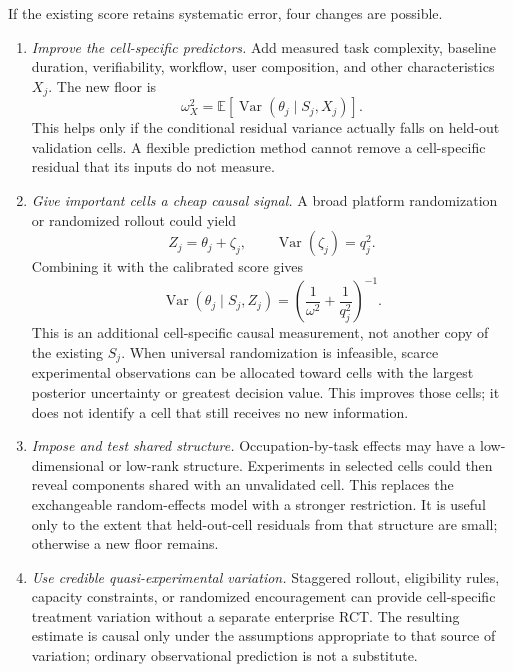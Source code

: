 \documentclass[11pt]{article}
\newcommand{\E}{\mathbb E}
\newcommand{\Var}{\operatorname{Var}}
\begin{document}
If the existing score retains systematic error, four changes are possible.

\begin{enumerate}[label=\arabic*.,leftmargin=2.2em]
 \item \textit{Improve the cell-specific predictors.} Add measured task
 complexity, baseline duration, verifiability, workflow, user composition,
 and other characteristics \(X_j\). The new floor is
 \begin{equation}
  \omega_X^2
  =\E[\Var(\theta_j\mid S_j,X_j)].
  \label{eq:x-floor}
 \end{equation}
 This helps only if the conditional residual variance actually falls on
 held-out validation cells. A flexible prediction method cannot remove a
 cell-specific residual that its inputs do not measure.

 \item \textit{Give important cells a cheap causal signal.} A broad platform
 randomization or randomized rollout could yield
 \begin{equation}
  Z_j=\theta_j+\zeta_j,
  \qquad
  \Var(\zeta_j)=q_j^2.
  \label{eq:cheap-causal-signal}
 \end{equation}
 Combining it with the calibrated score gives
 \begin{equation}
  \Var(\theta_j\mid S_j,Z_j)
  =\left(\frac1{\omega^2}+\frac1{q_j^2}\right)^{-1}.
  \label{eq:cheap-causal-variance}
 \end{equation}
 This is an additional cell-specific causal measurement, not another copy of
 the existing \(S_j\). When universal randomization is infeasible, scarce
 experimental observations can be allocated toward cells with the largest
 posterior uncertainty or greatest decision value. This improves those cells;
 it does not identify a cell that still receives no new information.

 \item \textit{Impose and test shared structure.} Occupation-by-task effects
 may have a low-dimensional or low-rank structure. Experiments in selected
 cells could then reveal components shared with an unvalidated cell. This
 replaces the exchangeable random-effects model with a stronger restriction.
 It is useful only to the extent that held-out-cell residuals from that
 structure are small; otherwise a new floor remains.

 \item \textit{Use credible quasi-experimental variation.} Staggered rollout,
 eligibility rules, capacity constraints, or randomized encouragement can
 provide cell-specific treatment variation without a separate enterprise RCT.
 The resulting estimate is causal only under the assumptions appropriate to
 that source of variation; ordinary observational prediction is not a
 substitute.


\end{enumerate}
\end{document}
